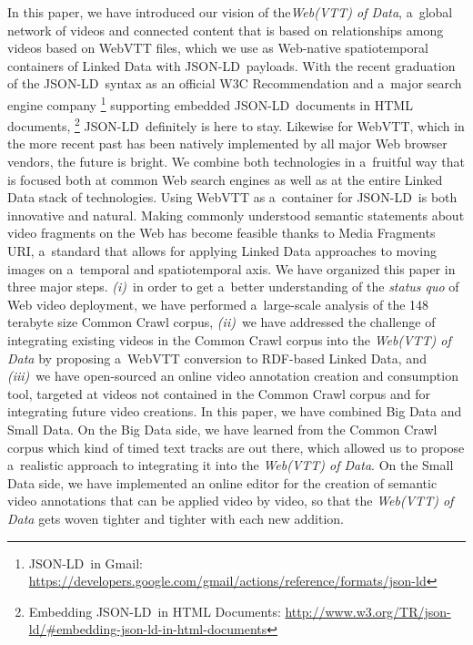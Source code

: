 \documentclass{sig-alternate-ceur}
\newcommand{\inlinelistingsize}{\fontsize{8pt}{11pt}}
\let\oldurl\url
\renewcommand{\url}[1]{\inlinelistingsize\oldurl{#1}}
\def\JSONLD{\mbox{JSON-LD}}
\begin{document}
In this paper, we have introduced our vision of the\linebreak \emph{Web(VTT) of Data},
a~global network of videos and connected content
that is based on relationships among videos based on WebVTT files,
which we use as Web-native spatiotemporal containers of Linked Data
with \JSONLD\ payloads.
With the recent graduation of the \JSONLD\ syntax
as an official W3C Recommendation and a~major search engine company%
\footnote{\JSONLD\ in Gmail:
\url{https://developers.google.com/gmail/actions/reference/formats/json-ld}}
supporting embedded \JSONLD\ documents in HTML documents,%
\footnote{Embedding \JSONLD\ in HTML Documents:
\url{http://www.w3.org/TR/json-ld/\#embedding-json-ld-in-html-documents}}
\JSONLD\ definitely is here to stay.
Likewise for WebVTT, which in the more recent past has been natively implemented
by all major Web browser vendors,
the future is bright.
We combine both technologies in a~fruitful way that is focused
both at common Web search engines
as well as at the entire Linked Data stack of technologies.
Using WebVTT as a~container for \JSONLD\ is both innovative and natural.
Making commonly understood semantic statements about video fragments on the Web
has become feasible thanks to Media Fragments URI,
a~standard that allows for applying Linked Data approaches to moving images
on a~temporal and spatiotemporal axis.
We have organized this paper in three major steps.
\emph{(i)}~in order to get a~better understanding of the \emph{status quo}
of Web video deployment, we have performed a~large-scale analysis
of the 148 terabyte size Common Crawl corpus,
\emph{(ii)}~we have addressed the challenge of integrating
existing videos in the Common Crawl corpus into the \emph{Web(VTT) of Data}
by proposing a~WebVTT conversion to RDF-based Linked Data,
and \emph{(iii)}~we have open-sourced an online video annotation creation
and consumption tool, targeted at videos not contained in the Common Crawl corpus
and for integrating future video creations.
In this paper, we have combined Big Data and Small Data.
On the Big Data side, we have learned from the Common Crawl corpus
which kind of timed text tracks are out there,
which allowed us to propose a~realistic approach to integrating it
into the \emph{Web(VTT) of Data}.
On the Small Data side, we have implemented an online editor for the creation
of semantic video annotations that can be applied video by video,
so that the \emph{Web(VTT) of Data} gets woven tighter and tighter with each new addition.
\end{document}
